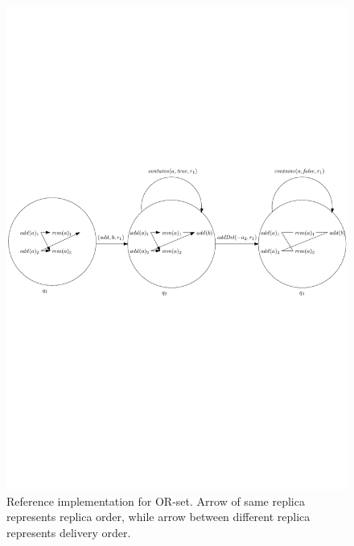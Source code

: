\begin{figure}[t]
  \centering
  \includegraphics[width=0.85 \textwidth]{figures/PIC-RImp.pdf}
  \caption{Reference implementation for OR-set. Arrow of same replica represents replica order, while arrow between different replica represents delivery order.}
  \label{fig:reference implementation for OR-set}
\end{figure}

